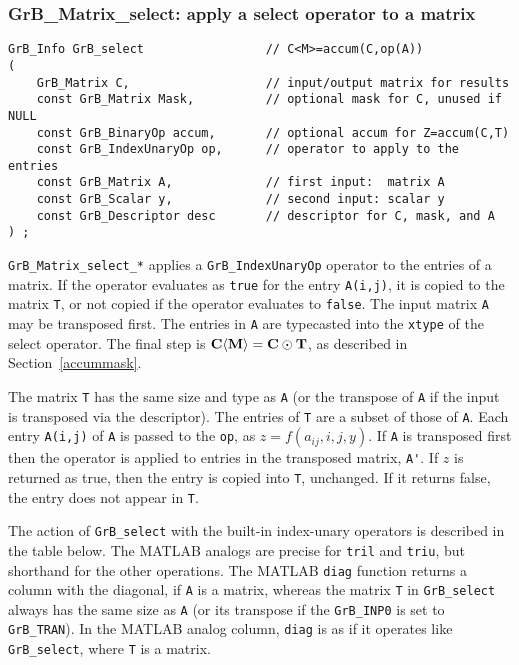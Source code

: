 \documentclass[12pt]{article}
\begin{document}
{\newpage
\subsubsection{{\sf GrB\_Matrix\_select:} apply a select operator to a matrix}
\label{select_matrix}

\begin{mdframed}[userdefinedwidth=6in]
{\footnotesize
\begin{verbatim}
GrB_Info GrB_select                 // C<M>=accum(C,op(A))
(
    GrB_Matrix C,                   // input/output matrix for results
    const GrB_Matrix Mask,          // optional mask for C, unused if NULL
    const GrB_BinaryOp accum,       // optional accum for Z=accum(C,T)
    const GrB_IndexUnaryOp op,      // operator to apply to the entries
    const GrB_Matrix A,             // first input:  matrix A
    const GrB_Scalar y,             // second input: scalar y
    const GrB_Descriptor desc       // descriptor for C, mask, and A
) ;
\end{verbatim} } \end{mdframed}

\verb'GrB_Matrix_select_*' applies a \verb'GrB_IndexUnaryOp' operator to the
entries of a matrix.  If the operator evaluates as \verb'true' for the entry
\verb'A(i,j)', it is copied to the matrix \verb'T', or not copied if the
operator evaluates to \verb'false'.  The input matrix \verb'A' may be
transposed first.  The entries in \verb'A' are typecasted into the \verb'xtype'
of the select operator.  The final step is ${\bf C \langle M \rangle  = C \odot
T}$, as described in Section~\ref{accummask}.

The matrix \verb'T' has the same size and type as \verb'A' (or the transpose of
\verb'A' if the input is transposed via the descriptor).  The entries of
\verb'T' are a subset of those of \verb'A'.  Each entry \verb'A(i,j)' of
\verb'A' is passed to the \verb'op', as $z=f(a_{ij},i,j,y)$.  If
\verb'A' is transposed first then the operator is applied to entries in the
transposed matrix, \verb"A'".  If $z$ is returned as true, then the entry is
copied into \verb'T', unchanged.  If it returns false, the entry does not
appear in \verb'T'.

The action of \verb'GrB_select' with the built-in index-unary operators is
described in the table below.  The MATLAB analogs are precise for \verb'tril'
and \verb'triu', but shorthand for the other operations.  The MATLAB
\verb'diag' function returns a column with the diagonal, if \verb'A' is a
matrix, whereas the matrix \verb'T' in \verb'GrB_select' always has the same
size as \verb'A' (or its transpose if the \verb'GrB_INP0' is set to
\verb'GrB_TRAN').  In the MATLAB analog column, \verb'diag' is as if it
operates like \verb'GrB_select', where \verb'T' is a matrix.

}
\end{document}
